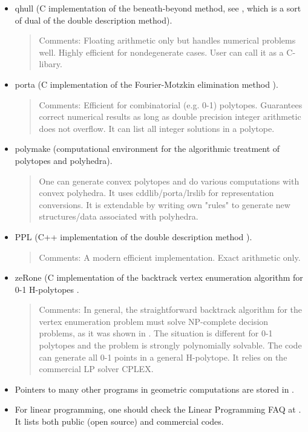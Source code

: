 \documentclass[[a4paper,12pt]{article}
\begin{document}
\begin{itemize}
\item qhull \cite{bdh-qach-96,bdh-qach-03} (C implementation of
the beneath-beyond method, see \cite{e-acg-87,m-cg-94},
which is a sort of dual of the double description method). 
\begin{quote}
Comments: Floating arithmetic only but handles numerical problems
well.  Highly efficient for nondegenerate cases.   
User can call it as a C-libary.
\end{quote}

\item porta \cite{cl-porta-97} (C implementation of
the Fourier-Motzkin elimination method \cite{z-lop-94}). 

\begin{quote}
Comments: Efficient for combinatorial (e.g. 0-1) polytopes.
Guarantees correct numerical results as long as
double precision integer arithmetic does not overflow.
It can list all integer solutions in a polytope.
\end{quote}

\item polymake \cite{gj-pm-99} (computational
environment for the algorithmic 
treatment of polytopes and polyhedra). 

\begin{quote}
One can generate convex polytopes and do various computations
with convex polyhedra.  
It uses cddlib/porta/lrslib for representation conversions. 
It is extendable by writing own "rules" to generate
new structures/data associated with polyhedra.
\end{quote}


\item PPL  \cite{b-pplhome} (C++ implementation of the double description method \cite{mrtt-ddm-53}). 
\begin{quote}
Comments: A modern efficient implementation.  Exact arithmetic only.
\end{quote}

\item zeRone \cite{l-zvefzo-99} (C implementation of
the backtrack vertex enumeration algorithm for
0-1 H-polytopes \cite{bl-vs01ps-98}. 

\begin{quote}
Comments: In general, the straightforward backtrack algorithm
for the vertex enumeration problem must solve NP-complete
decision problems, as it was shown in \cite{flm-abala-97}.
The situation is different for 0-1 polytopes and 
the problem is strongly polynomially solvable.  The code
can generate all 0-1 points in a general H-polytope.
It relies on the commercial LP solver CPLEX.
\end{quote}


\item Pointers to many other programs in geometric computations 
are stored in \cite{a-dcg,e-cgp}. 

\item For linear programming, one should check the Linear Programming
FAQ at \cite{fg-lpfaq}.  It lists both public (open source) and commercial
codes.

\end{itemize}
\end{document}
